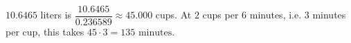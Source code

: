 $10.6465$ liters is $\dfrac{10.6465}{0.236589}\approx45.000$ cups. At $2$ cups per $6$ minutes, i.e. $3$ minutes per cup, this takes $45\cdot3=\boxed{135\text{ minutes}}$.
